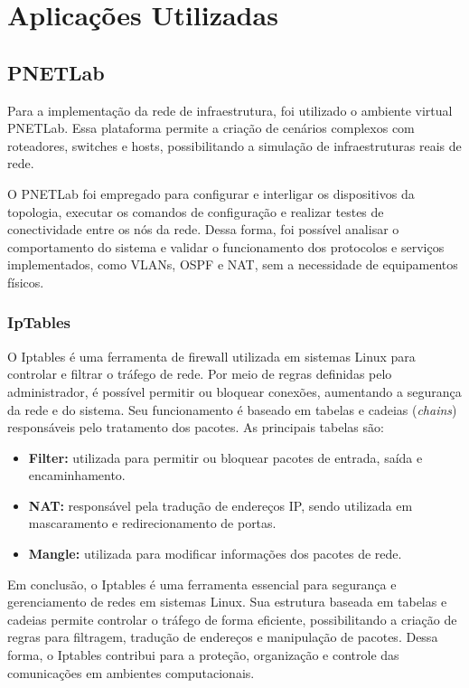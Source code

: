 \section{Aplicações Utilizadas}

\subsection{PNETLab}

Para a implementação da rede de infraestrutura, foi utilizado o ambiente virtual PNETLab\cite{pnetlab}. Essa plataforma permite a criação de cenários complexos com roteadores, switches e hosts, possibilitando a simulação de infraestruturas reais de rede.

O PNETLab foi empregado para configurar e interligar os dispositivos da topologia, executar os comandos de configuração e realizar testes de conectividade entre os nós da rede. Dessa forma, foi possível analisar o comportamento do sistema e validar o funcionamento dos protocolos e serviços implementados, como VLANs, OSPF e NAT, sem a necessidade de equipamentos físicos.

\subsubsection{IpTables}

O Iptables é uma ferramenta de firewall utilizada em sistemas Linux para controlar e filtrar o tráfego de rede. Por meio de regras definidas pelo administrador, é possível permitir ou bloquear conexões, aumentando a segurança da rede e do sistema. Seu funcionamento é baseado em tabelas e cadeias (\textit{chains}) responsáveis pelo tratamento dos pacotes. As principais tabelas são: \begin{itemize} \item \textbf{Filter:} utilizada para permitir ou bloquear pacotes de entrada, saída e encaminhamento. \item \textbf{NAT:} responsável pela tradução de endereços IP, sendo utilizada em mascaramento e redirecionamento de portas. \item \textbf{Mangle:} utilizada para modificar informações dos pacotes de rede. \end{itemize}

Em conclusão, o Iptables é uma ferramenta essencial para segurança e gerenciamento de redes em sistemas Linux. 
Sua estrutura baseada em tabelas e cadeias permite controlar o tráfego de forma eficiente, possibilitando a criação 
de regras para filtragem, tradução de endereços e manipulação de pacotes. Dessa forma, o Iptables contribui para 
a proteção, organização e controle das comunicações em ambientes computacionais.


